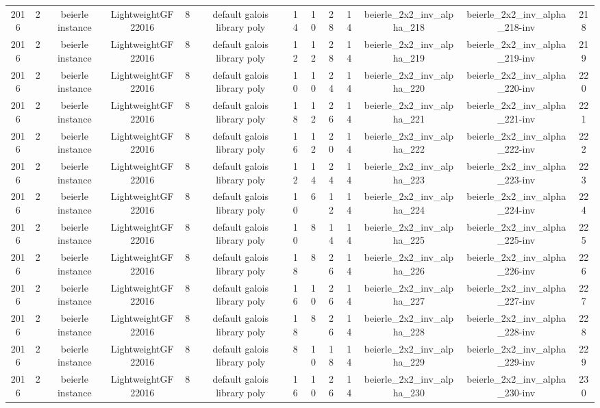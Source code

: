 \begin{tabular}{c c c c c c c c c c c c c}
2016 & 2 & beierle instance & LightweightGF22016 & 8 & default galois library poly & 14 & 10 & 28 & 14 & beierle_2x2_inv_alpha_218 & beierle_2x2_inv_alpha_218-inv & 218 \\
2016 & 2 & beierle instance & LightweightGF22016 & 8 & default galois library poly & 12 & 12 & 28 & 14 & beierle_2x2_inv_alpha_219 & beierle_2x2_inv_alpha_219-inv & 219 \\
2016 & 2 & beierle instance & LightweightGF22016 & 8 & default galois library poly & 10 & 10 & 24 & 14 & beierle_2x2_inv_alpha_220 & beierle_2x2_inv_alpha_220-inv & 220 \\
2016 & 2 & beierle instance & LightweightGF22016 & 8 & default galois library poly & 18 & 12 & 26 & 14 & beierle_2x2_inv_alpha_221 & beierle_2x2_inv_alpha_221-inv & 221 \\
2016 & 2 & beierle instance & LightweightGF22016 & 8 & default galois library poly & 16 & 12 & 20 & 14 & beierle_2x2_inv_alpha_222 & beierle_2x2_inv_alpha_222-inv & 222 \\
2016 & 2 & beierle instance & LightweightGF22016 & 8 & default galois library poly & 12 & 14 & 24 & 14 & beierle_2x2_inv_alpha_223 & beierle_2x2_inv_alpha_223-inv & 223 \\
2016 & 2 & beierle instance & LightweightGF22016 & 8 & default galois library poly & 10 & 6 & 12 & 14 & beierle_2x2_inv_alpha_224 & beierle_2x2_inv_alpha_224-inv & 224 \\
2016 & 2 & beierle instance & LightweightGF22016 & 8 & default galois library poly & 10 & 8 & 14 & 14 & beierle_2x2_inv_alpha_225 & beierle_2x2_inv_alpha_225-inv & 225 \\
2016 & 2 & beierle instance & LightweightGF22016 & 8 & default galois library poly & 18 & 8 & 26 & 14 & beierle_2x2_inv_alpha_226 & beierle_2x2_inv_alpha_226-inv & 226 \\
2016 & 2 & beierle instance & LightweightGF22016 & 8 & default galois library poly & 16 & 10 & 26 & 14 & beierle_2x2_inv_alpha_227 & beierle_2x2_inv_alpha_227-inv & 227 \\
2016 & 2 & beierle instance & LightweightGF22016 & 8 & default galois library poly & 18 & 8 & 26 & 14 & beierle_2x2_inv_alpha_228 & beierle_2x2_inv_alpha_228-inv & 228 \\
2016 & 2 & beierle instance & LightweightGF22016 & 8 & default galois library poly & 8 & 10 & 18 & 14 & beierle_2x2_inv_alpha_229 & beierle_2x2_inv_alpha_229-inv & 229 \\
2016 & 2 & beierle instance & LightweightGF22016 & 8 & default galois library poly & 16 & 10 & 26 & 14 & beierle_2x2_inv_alpha_230 & beierle_2x2_inv_alpha_230-inv & 230 \\

\end{tabular}
